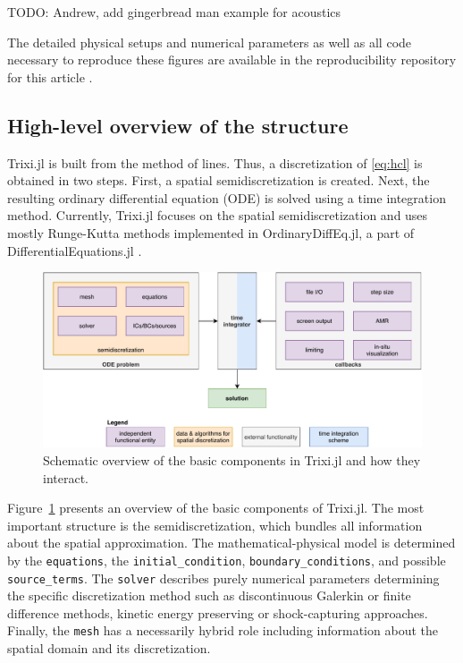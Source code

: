 \documentclass{juliacon}
\newcommand{\trixi}{Trixi.jl\xspace}
\newcommand{\todo}[1]{{\color{red}#1}}
\begin{document}
\todo{TODO: Andrew, add gingerbread man example for acoustics} %

The detailed physical setups and numerical parameters as well as all code
necessary to reproduce these figures are available in the reproducibility
repository for this article \cite{ranocha2021adaptiveRepro}.


\subsection{High-level overview of the structure}

\trixi is built from the method of lines. Thus, a discretization of \eqref{eq:hcl}
is obtained in two steps. First, a spatial semidiscretization is created. Next,
the resulting ordinary differential equation (ODE) is solved using a time
integration method. Currently, \trixi focuses on the spatial semidiscretization
and uses mostly Runge-Kutta methods implemented in OrdinaryDiffEq.jl, a part
of DifferentialEquations.jl \cite{rackauckas2017differentialequations}.

\begin{figure}[htbp]
  \includegraphics[width=\linewidth]{../figures/trixi_global_overview}
  \caption{Schematic overview of the basic components in \trixi and how they
           interact.}
  \label{fig:trixi_global_overview}
\end{figure}

Figure~\ref{fig:trixi_global_overview} presents an overview of the basic
components of \trixi. The most important structure is the semidiscretization,
which bundles all information about the spatial approximation. The mathematical-physical
model is determined by the \lstinline{equations}, the \lstinline{initial_condition},
\lstinline{boundary_conditions}, and possible \lstinline{source_terms}. The
\lstinline{solver} describes purely numerical parameters determining the specific
discretization method such as discontinuous Galerkin or finite difference
methods, kinetic energy preserving or shock-capturing approaches. Finally, the
\lstinline{mesh} has a necessarily hybrid role including information about the
spatial domain and its discretization.
\end{document}
